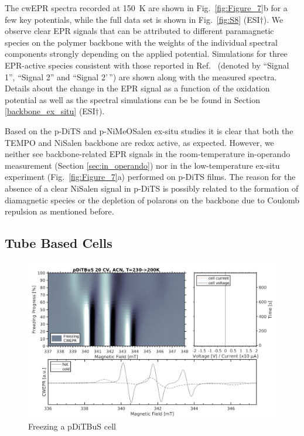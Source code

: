 The cwEPR spectra recorded at 150~K are shown in Fig.~\ref{fig:Figure_7}b for a few key potentials, while the full data set is shown in Fig.~\ref{fig:S8} (ESI$\dag$). We observe clear EPR signals that can be attributed to different paramagnetic species on the polymer backbone with the weights of the individual spectral components strongly depending on the applied potential. Simulations for three EPR-active species consistent with those reported in Ref.~\cite{Dmitrieva2018} (denoted by ``Signal 1'', ``Signal 2'' and ``Signal 2'\,'') are shown along with the measured spectra. Details about the change in the EPR signal as a function of the oxidation potential as well as the spectral simulations can be be found in Section \ref{backbone_ex_situ} (ESI$\dag$).

%
\par

Based on the p-DiTS and p-NiMeOSalen ex-situ studies it is clear that both the TEMPO and NiSalen backbone are redox active, as expected. However, we neither see backbone-related EPR signals in the room-temperature in-operando measurement (Section \ref{sec:in_operando}) nor in the low-temperature ex-situ experiment (Fig.~\ref{fig:Figure_7}a) performed on p-DiTS films. The reason for the absence of a clear NiSalen signal in p-DiTS is possibly related to the formation of diamagnetic species or the depletion of polarons on the backbone due to Coulomb repulsion as mentioned before.


\subsection{Tube Based Cells}

\begin{figure}[h]
\center
	\includegraphics[width=1\textwidth]{./operando_epr/figures/CRYO/SANDWICH_FREEZING.pdf}
	\caption{Freezing a pDiTBuS cell}
	\label{fig:operando_cold_battery}
\end{figure}


